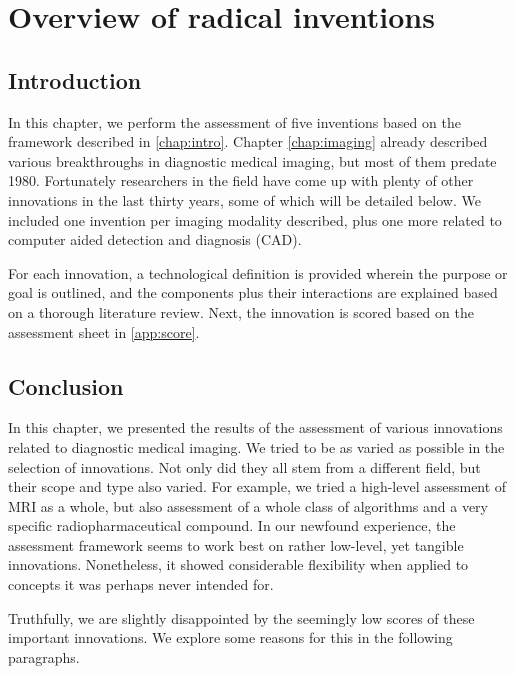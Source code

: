 \chapter{Overview of radical inventions}\label{chap:inventions}

\section{Introduction}
In this chapter, we perform the assessment of five inventions based on the
framework described in \autoref{chap:intro}. Chapter \ref{chap:imaging}
already described various breakthroughs in diagnostic medical imaging, but most of them
predate 1980. Fortunately researchers in the field have come up with plenty of
other innovations in the last thirty years, some of which will be detailed
below. We included one invention per imaging modality described, plus one more
related to computer aided detection and diagnosis (CAD).

For each innovation, a technological definition is provided wherein the purpose
or goal is outlined, and the components plus their interactions are explained
based on a thorough literature review. Next, the innovation is scored based on
the assessment sheet in \autoref{app:score}.











\section{Conclusion}
In this chapter, we presented the results of the assessment of various
innovations related to diagnostic medical imaging. We tried to be as varied as
possible in the selection of innovations. Not only did they all stem from a
different field, but their scope and type also varied. For example, we tried a
high-level assessment of MRI as a whole, but also assessment of a whole class of
algorithms and a very specific radiopharmaceutical compound. In our newfound
experience, the assessment framework seems to work best on rather low-level, yet
tangible innovations. Nonetheless, it showed considerable flexibility when
applied to concepts it was perhaps never intended for.

Truthfully, we are slightly disappointed by the seemingly low scores of these
important innovations. We explore some reasons for this in the following
paragraphs.

